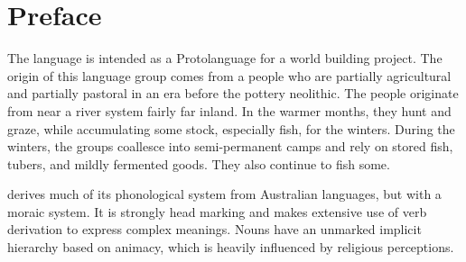 \section{Preface}
The \langname language is intended as a Protolanguage for a world building project. The origin of this language group comes from a people who are partially agricultural and partially pastoral in an era before the pottery neolithic. The people originate from near a river system fairly far inland. In the warmer months, they hunt and graze, while accumulating some stock, especially fish, for the winters. During the winters, the groups coallesce into semi-permanent camps and rely on stored fish, tubers, and mildly fermented goods. They also continue to fish some.

\langname derives much of its phonological system from Australian languages, but with a moraic system. It is strongly head marking and makes extensive use of verb derivation to express complex meanings. Nouns have an unmarked implicit hierarchy based on animacy, which is heavily influenced by religious perceptions.
